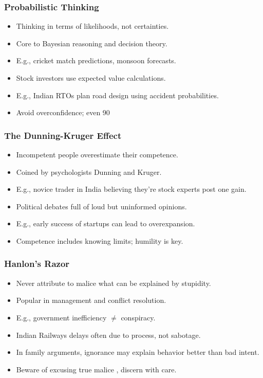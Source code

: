 \begin{frame}[fragile]\frametitle{Probabilistic Thinking}
  \begin{itemize}
    \item Thinking in terms of likelihoods, not certainties.
    \item Core to Bayesian reasoning and decision theory.
    \item E.g., cricket match predictions, monsoon forecasts.
    \item Stock investors use expected value calculations.
    \item E.g., Indian RTOs plan road design using accident probabilities.
    \item Avoid overconfidence; even 90%
  \end{itemize}
\end{frame}

\begin{frame}[fragile]\frametitle{The Dunning-Kruger Effect}
  \begin{itemize}
    \item Incompetent people overestimate their competence.
    \item Coined by psychologists Dunning and Kruger.
    \item E.g., novice trader in India believing they're stock experts post one gain.
    \item Political debates full of loud but uninformed opinions.
    \item E.g., early success of startups can lead to overexpansion.
    \item Competence includes knowing limits; humility is key.
  \end{itemize}
\end{frame}

\begin{frame}[fragile]\frametitle{Hanlon's Razor}
  \begin{itemize}
    \item Never attribute to malice what can be explained by stupidity.
    \item Popular in management and conflict resolution.
    \item E.g., government inefficiency $\neq$ conspiracy.
    \item Indian Railways delays often due to process, not sabotage.
    \item In family arguments, ignorance may explain behavior better than bad intent.
    \item Beware of excusing true malice , discern with care.
  \end{itemize}
\end{frame}

